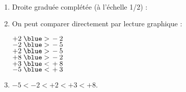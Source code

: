    \ \\ [-5mm]
   \begin{enumerate}
      \item Droite graduée complétée (à l'échelle 1/2) : \\ [2mm]
      \hspace*{-10mm} 
      \item On peut comparer directement par lecture graphique :
         \begin{multicols}{3}
            $+2 \; {\blue >} \, -2$ \\ \smallskip
            $-2  \; {\blue >} \, -5$ \\ \smallskip
            $+2 \; {\blue >} \, -5$ \\
            $+8 \; {\blue >} \, -2$ \\
            $+3 \; {\blue <} \, +8$ \\
            $-5 \; {\blue <} \, +3$
         \end{multicols}
         \vspace*{-3mm}
      \item \blue$-5<-2<+2<+3<+8$.
   \end{enumerate}
